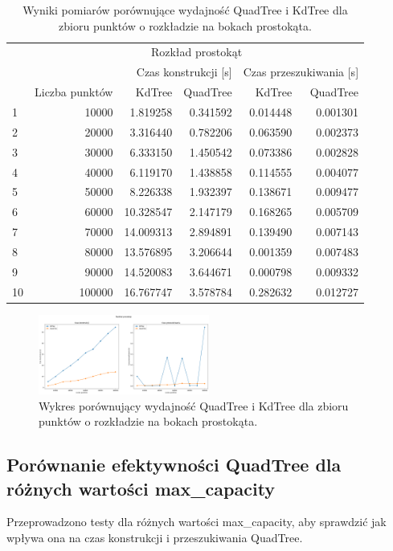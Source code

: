 \documentclass{lab}
\begin{document}
\begin{table}[H]
\centering
\begin{tabular}{lrrrrr}
  \toprule
   & \multicolumn{5}{c}{Rozkład prostokąt} \\
   &  & \multicolumn{2}{r}{Czas konstrukcji [s]} & \multicolumn{2}{r}{Czas przeszukiwania [s]} \\
   & Liczba punktów & KdTree & QuadTree & KdTree & QuadTree \\
  \midrule
  1 & 10000 & 1.819258 & 0.341592 & 0.014448 & 0.001301 \\
  2 & 20000 & 3.316440 & 0.782206 & 0.063590 & 0.002373 \\
  3 & 30000 & 6.333150 & 1.450542 & 0.073386 & 0.002828 \\
  4 & 40000 & 6.119170 & 1.438858 & 0.114555 & 0.004077 \\
  5 & 50000 & 8.226338 & 1.932397 & 0.138671 & 0.009477 \\
  6 & 60000 & 10.328547 & 2.147179 & 0.168265 & 0.005709 \\
  7 & 70000 & 14.009313 & 2.894891 & 0.139490 & 0.007143 \\
  8 & 80000 & 13.576895 & 3.206644 & 0.001359 & 0.007483 \\
  9 & 90000 & 14.520083 & 3.644671 & 0.000798 & 0.009332 \\
  10 & 100000 & 16.767747 & 3.578784 & 0.282632 & 0.012727 \\
  \bottomrule
  \end{tabular}
\caption{Wyniki pomiarów porównujące wydajność QuadTree i KdTree dla zbioru punktów o rozkładzie na bokach prostokąta.}
\label{tab:rectangle_time}
\end{table}

\begin{figure}[H]
  \centering
  \includegraphics[width=0.5\textwidth]{resources/rectangle_graph.png}
  \caption{Wykres porównujący wydajność QuadTree i KdTree dla zbioru punktów o rozkładzie na bokach prostokąta.}
  \label{fig:rectangle_graph}
\end{figure}

\subsection{Porównanie efektywności QuadTree dla różnych wartości max\_capacity}
Przeprowadzono testy dla różnych wartości max\_capacity, aby sprawdzić jak wpływa ona na czas konstrukcji i przeszukiwania QuadTree.
\end{document}
